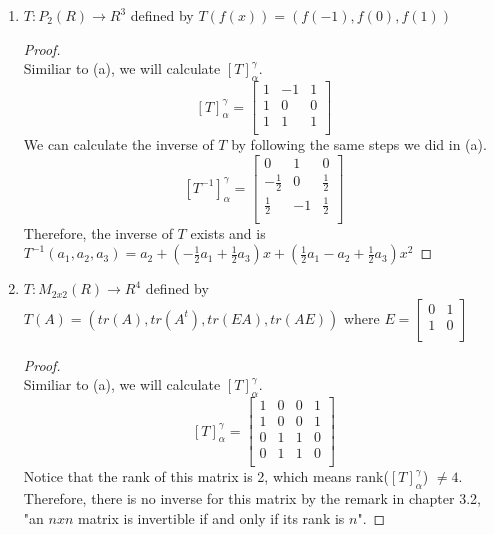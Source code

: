 \documentclass[11pt]{scrartcl}
\begin{document}
\begin{enumerate}[label=\alph*.]
{	}

	\item{
		$T:P_2(R) \rightarrow R^3$ defined by $T(f(x)) = (f(-1),f(0),f(1))$
		\begin{proof}
		\-\\
		Similiar to (a), we will calculate $[T]_{\alpha}^{\gamma}$.
		\[
		[T]_{\alpha}^{\gamma} = 
		\begin{bmatrix}
			1 & -1 & 1\\
			1 & 0 & 0\\
			1 & 1 & 1 \\
		\end{bmatrix}
		\]
		We can calculate the inverse of $T$ by following the same steps we did in (a).
		\[
		[T^{-1}]_{\alpha}^{\gamma} = 
		\begin{bmatrix}
			0 & 1 & 0\\
			-\frac12 & 0 & \frac12\\
			\frac12 & -1 & \frac12\\
		\end{bmatrix}
		\]
		Therefore, the inverse of $T$ exists and is \\$T^{-1}(a_1, a_2, a_3) 
		=a_2 + (-\frac12 a_1 + \frac12 a_3)x + (\frac12a_1 -a_2 + \frac12a_3)x^2$
		\end{proof}
		}

		\item{
		$T:M_{2x2}(R) \rightarrow R^4$ defined by $T(A) = (tr(A), tr(A^t), tr(EA), tr(AE))$
		where 
		$E = 
		\begin{bmatrix}
		0 & 1 \\
		1 & 0 \\ 
		\end{bmatrix}
		$
		\begin{proof}
		\-\\
		Similiar to (a), we will calculate $[T]_{\alpha}^{\gamma}$.
		\[
		[T]_{\alpha}^{\gamma} = 
		\begin{bmatrix}
			1 & 0 & 0 & 1\\
			1 & 0 & 0 & 1\\
			0 & 1 & 1 & 0\\
			0 & 1 & 1 & 0\\
		\end{bmatrix}
		\]
		Notice that the rank of this matrix is 2, which means rank($[T]_{\alpha}^{\gamma}$) $\neq 4$.
		Therefore, there is no inverse for this matrix by the remark in chapter 3.2,
		"an $nxn$ matrix is invertible if and only if its rank is $n$".
		\end{proof}
		}
\end{enumerate}
\end{document}
